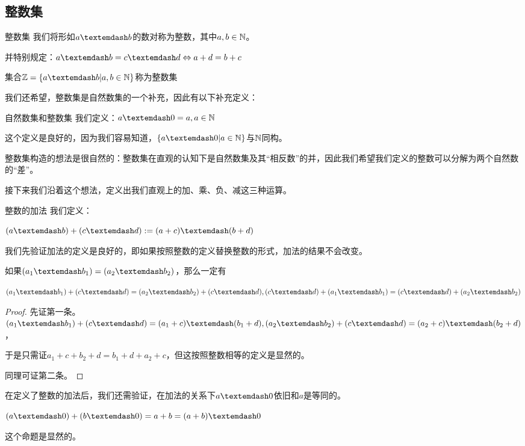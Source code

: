 \documentclass[12pt, a4paper, oneside, UTF8]{ctexbook}
\begin{document}
		\subsection{整数集}
			\begin{para}{0}
					\begin{defn}{整数集}{}
						我们将形如$a\textemdash b$的数对称为整数，其中$a,b \in \mathbb{N}$。
						
						并特别规定：$a\textemdash b = c\textemdash d \Leftrightarrow a+d=b+c$
						
						集合$\Z = \{a\textemdash b| a,b \in \N\}$称为整数集
					\end{defn}
					我们还希望，整数集是自然数集的一个补充，因此有以下补充定义：
					\begin{defn}{自然数集和整数集}{}
						我们定义：$a\textemdash 0 = a,a\in\N$
					\end{defn}
					这个定义是良好的，因为我们容易知道，$\{a\textemdash 0 | a\in\N\}$与$\mathbb{N}$同构。
					
					整数集构造的想法是很自然的：整数集在直观的认知下是自然数集及其“相反数”的并，因此我们希望我们定义的整数可以分解为两个自然数的“差”。
					
					接下来我们沿着这个想法，定义出我们直观上的加、乘、负、减这三种运算。
					\begin{defn}{整数的加法}{}
						我们定义：
						
						$(a\textemdash b)+(c\textemdash d) := (a+c)\textemdash(b+d)$
					\end{defn}
					我们先验证加法的定义是良好的，即如果按照整数的定义替换整数的形式，加法的结果不会改变。
					\begin{proposition}{}
						如果$(a_1\textemdash b_1)=(a_2\textemdash b_2)$，那么一定有
						
						$(a_1\textemdash b_1)+(c\textemdash d)=(a_2\textemdash b_2)+(c\textemdash d),(c\textemdash d)+(a_1\textemdash b_1)=(c\textemdash d)+(a_2\textemdash b_2)$
					\end{proposition}
					\begin{proof}
						先证第一条。$(a_1\textemdash b_1)+(c\textemdash d)=(a_1+c)\textemdash(b_1+d),(a_2\textemdash b_2)+(c\textemdash d)=(a_2+c)\textemdash(b_2+d)$，
						
						于是只需证$a_1+c+b_2+d=b_1+d+a_2+c$，但这按照整数相等的定义是显然的。
						
						同理可证第二条。
					\end{proof}
					在定义了整数的加法后，我们还需验证，在加法的关系下$a \textemdash 0$依旧和$a$是等同的。
					\begin{proposition}
						$(a\textemdash 0)+(b\textemdash 0) = a+b = (a+b)\textemdash 0$
					\end{proposition}
					这个命题是显然的。
					

\end{para}
\end{document}
